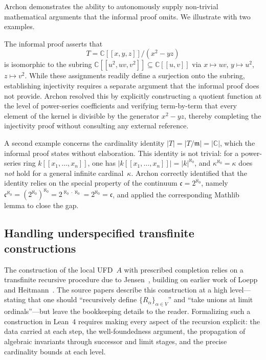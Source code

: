 \documentclass[]{pkuai4m}
\theoremstyle{plain}
\theoremstyle{definition}
\begin{document}
Archon demonstrates the ability to autonomously supply non-trivial mathematical arguments that the informal proof omits. We illustrate with two examples.

The informal proof asserts that
\[
T = \mathbb{C}[[x,y,z]]/(x^2 - yz)
\]
is isomorphic to the subring $\mathbb{C}[[u^2, uv, v^2]] \subseteq \mathbb{C}[[u,v]]$ via $x \mapsto uv$, $y \mapsto u^2$, $z \mapsto v^2$. While these assignments readily define a surjection onto the subring, establishing injectivity requires a separate argument that the informal proof does not provide. Archon resolved this by explicitly constructing a quotient function at the level of power-series coefficients and verifying term-by-term that every element of the kernel is divisible by the generator $x^2 - yz$, thereby completing the injectivity proof without consulting any external reference.

A second example concerns the cardinality identity $|T| = |T/\mathfrak{m}| = |\mathbb{C}|$, which the informal proof states without elaboration. This identity is not trivial: for a power-series ring $k[[x_1, \ldots, x_n]]$, one has $|k[[x_1, \ldots, x_n]]| = |k|^{\aleph_0}$, and $\kappa^{\aleph_0} = \kappa$ does \emph{not} hold for a general infinite cardinal~$\kappa$. Archon correctly identified that the identity relies on the special property of the continuum $\mathfrak{c} = 2^{\aleph_0}$, namely $\mathfrak{c}^{\aleph_0} = (2^{\aleph_0})^{\aleph_0} = 2^{\aleph_0 \cdot \aleph_0} = 2^{\aleph_0} = \mathfrak{c}$, and applied the corresponding Mathlib lemma to close the gap.

\subsection{Handling underspecified transfinite constructions}\label{subsubsec:transfinite}

The construction of the local UFD~$A$ with prescribed completion relies on a transfinite recursive procedure due to Jensen~\cite{jensen2006completions}, building on earlier work of Loepp~\cite{loepp1997constructing} and Heitmann~\cite{heitmann1993characterization}. The source papers describe this construction at a high level---stating that one should ``recursively define $\{R_\alpha\}_{\alpha \in V}$'' and ``take unions at limit ordinals''---but leave the bookkeeping details to the reader. Formalizing such a construction in Lean~4 requires making every aspect of the recursion explicit: the data carried at each step, the well-foundedness argument, the propagation of algebraic invariants through successor and limit stages, and the precise cardinality bounds at each level.
\end{document}
